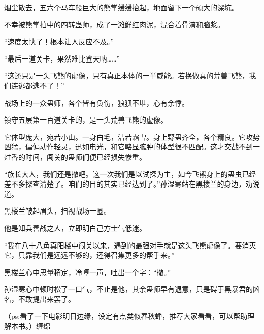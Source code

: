 \begin{this_body}
烟尘散去，五六个马车般巨大的熊掌缓缓抬起，地面留下一个硕大的深坑。

不幸被熊掌拍中的四转蛊师，成了一滩鲜红肉泥，混合着骨渣和脑浆。

“速度太快了！根本让人反应不及。”

“最后一道关卡，果然难比登天呐……”

“这还只是一头飞熊的虚像，只有真正本体的一半威能。若换做真的荒兽飞熊，我们连逃都逃不了！”

战场上的一众蛊师，各个皆有负伤，狼狈不堪，心有余悸。

镇守五层第一百道关卡的，是一头荒兽飞熊的虚像。

它体型庞大，宛若小山。一身白毛，洁若霜雪。身上野蛊齐全，各个精良。它攻势凶猛，偏偏动作轻灵，迅如电光，和它略显臃肿的体型很不匹配。这才交战不到一炷香的时间，闯关的蛊师们便已经损失惨重。

“族长大人，我们还是撤吧。这一次我们是以试探为主，如今飞熊身上的蛊虫已经差不多探查清楚了。咱们的目的其实已经达到了。”孙湿寒站在黑楼兰的身边，劝说道。

黑楼兰皱起眉头，扫视战场一圈。

他是知兵善战之人，立即明白己方士气低迷。

“我在八十八角真阳楼中闯关以来，遇到的最强对手就是这头飞熊虚像了。要消灭它，只靠我们是远远不够的，还得召集更多的帮手来。”

黑楼兰心中思量稍定，冷哼一声，吐出一个字：“撤。”

孙湿寒心中顿时松了一口气，不止是他，其余蛊师早有退意，只是碍于黑暴君的凶名，不敢提出来罢了。

（ps:看了一下电影明日边缘，设定有点类似春秋蝉，推荐大家看看，可以帮助理解本书。）缠绵

\end{this_body}

